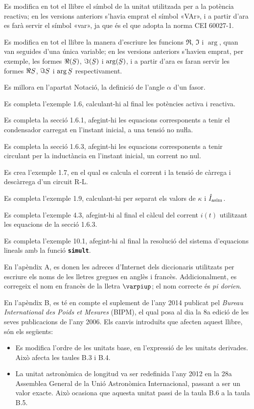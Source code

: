 Es modifica en tot el llibre el símbol de la unitat  utilitzada per a la potència reactiva; en les versions anteriors s'havia emprat el símbol «VAr», i a partir d'ara es farà servir el símbol «var», ja que és el que adopta la norma CEI 60027-1.

Es modifica en tot el llibre la manera d'escriure les funcions $\Re$, $\Im$ i $\arg$, quan van seguides d'una única variable; en les versions anteriors s'havien emprat, per exemple, les formes $\Re(\cmplx{S})$, $\Im(\cmplx{S})$ i $\arg(\cmplx{S})$, i a partir d'ara es faran servir les formes $\Re\cmplx{S}$, $\Im\cmplx{S}$ i $\arg\cmplx{S}$ respectivament.


Es millora en l’apartat Notació, la definició de l’angle $\alpha$ d’un fasor.


Es completa l'exemple 1.6, calculant-hi al final les potències activa i reactiva.

Es completa la secció 1.6.1, afegint-hi les equacions corresponents a tenir el condensador carregat en l'instant inicial, a una tensió no nuŀla.

Es completa la secció 1.6.3, afegint-hi les equacions corresponents a tenir circulant per la inductància en l'instant  inicial, un corrent no nul.

Es crea l'exemple 1.7, en el qual es calcula el corrent i la tensió de càrrega i descàrrega d'un circuit R-L.

Es completa l'exemple 1.9, calculant-hi per separat els valors de $\kappa$ i $\hat{I}_\mathrm{asim}$.


Es completa l'exemple 4.3, afegint-hi al final el càlcul del corrent $i(t)$ utilitzant les equacions de la secció 1.6.3.

Es completa l'exemple 10.1, afegint-hi al final la resolució del sistema d'equacions lineals amb la funció \texttt{\textbf{simult}}.


En l'apèndix A, es donen les adreces d'Internet dels diccionaris utilitzats per escriure els noms de les lletres gregues en anglès i francès. Addicionalment, es corregeix el nom en francès de la lletra $\varpiup$; el nom correcte és \textit{pi dorien}.

En l'apèndix B, es té en compte el suplement de l'any 2014 publicat pel  \textit{Bureau International des Poids et Mesures} (BIPM), el qual posa al dia la 8a edició de les seves publicacions de l'any 2006. Els canvis introduïts que afecten aquest llibre, són els següents:
\begin{itemize}
  \item Es modifica l'ordre de les unitats base, en l'expressió de les unitats derivades. Això afecta les taules B.3 i B.4.
  \item La unitat astronòmica de longitud va ser redefinida l'any 2012 en la 28a Assemblea General de la Unió Astronòmica Internacional, passant a ser un valor exacte. Això ocasiona que aquesta unitat passi de la taula B.6  a la taula  B.5.
\end{itemize}

